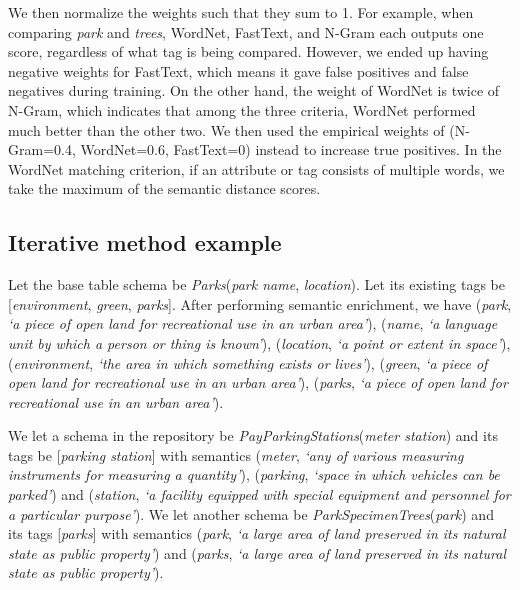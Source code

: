 We then normalize the weights such that they sum to 1. For example, when comparing \textit{park} and \textit{trees}, WordNet, FastText, and N-Gram each outputs one score, regardless of what tag is being compared. However, we ended up having negative weights for FastText, which means it gave false positives and false negatives during training. On the other hand, the weight of WordNet is twice of N-Gram, which indicates that among the three criteria, WordNet performed much better than the other two. We then used the empirical weights of (N-Gram=0.4, WordNet=0.6, FastText=0) instead to increase true positives. In the WordNet matching criterion, if an attribute or tag consists of multiple words, we take the maximum of the semantic distance scores.

\subsection{Iterative method example}
\label{ssec:IterativeMethodExample2}

Let the base table schema be \textit{Parks}(\textit{park name}, \textit{location}). Let its existing tags be [\textit{environment}, \textit{green}, \textit{parks}]. After performing semantic enrichment, we have (\textit{park}, \textit{`a piece of open land for recreational use in an urban area'}), (\textit{name}, \textit{`a language unit by which a person or thing is known'}), (\textit{location}, \textit{`a point or extent in space'}), (\textit{environment}, \textit{`the area in which something exists or lives'}), (\textit{green}, \textit{`a piece of open land for recreational use in an urban area'}), (\textit{parks}, \textit{`a piece of open land for recreational use in an urban area'}).

We let a schema in the repository be \textit{PayParkingStations}(\textit{meter station}) and its tags be [\textit{parking station}] with semantics (\textit{meter}, \textit{`any of various measuring instruments for measuring a quantity'}), (\textit{parking}, \textit{`space in which vehicles can be parked'}) and (\textit{station}, \textit{`a facility equipped with special equipment and personnel for a particular purpose'}). We let another schema be \textit{ParkSpecimenTrees}(\textit{park}) and its tags [\textit{parks}] with semantics (\textit{park}, \textit{`a large area of land preserved in its natural state as public property'}) and (\textit{parks}, \textit{`a large area of land preserved in its natural state as public property'}).


